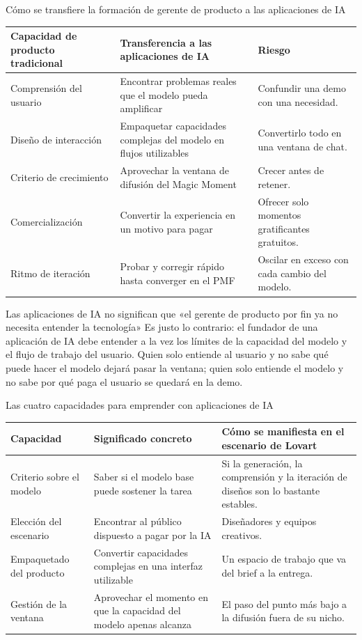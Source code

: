 \documentclass[a4paper]{article}
\begin{document}
\begin{knowledgebox}{Cómo se transfiere la formación de gerente de producto a las aplicaciones de IA}
\begin{tabularx}{\textwidth}{p{}p{}X}
\toprule
Capacidad de producto tradicional & Transferencia a las aplicaciones de IA & Riesgo \\
\midrule
Comprensión del usuario & Encontrar problemas reales que el modelo pueda amplificar & Confundir una demo con una necesidad. \\
Diseño de interacción & Empaquetar capacidades complejas del modelo en flujos utilizables & Convertirlo todo en una ventana de chat. \\
Criterio de crecimiento & Aprovechar la ventana de difusión del Magic Moment & Crecer antes de retener. \\
Comercialización & Convertir la experiencia en un motivo para pagar & Ofrecer solo momentos gratificantes gratuitos. \\
Ritmo de iteración & Probar y corregir rápido hasta converger en el PMF & Oscilar en exceso con cada cambio del modelo. \\
\bottomrule
\end{tabularx}
\end{knowledgebox}

\begin{warningbox}{Las aplicaciones de IA no significan que «el gerente de producto por fin ya no necesita entender la tecnología»}
Es justo lo contrario: el fundador de una aplicación de IA debe entender a la vez los límites de la capacidad del modelo y el flujo de trabajo del usuario. Quien solo entiende al usuario y no sabe qué puede hacer el modelo dejará pasar la ventana; quien solo entiende el modelo y no sabe por qué paga el usuario se quedará en la demo.
\end{warningbox}

\begin{knowledgebox}{Las cuatro capacidades para emprender con aplicaciones de IA}
\begin{tabularx}{\textwidth}{p{}p{}X}
\toprule
Capacidad & Significado concreto & Cómo se manifiesta en el escenario de Lovart \\
\midrule
Criterio sobre el modelo & Saber si el modelo base puede sostener la tarea & Si la generación, la comprensión y la iteración de diseños son lo bastante estables. \\
Elección del escenario & Encontrar al público dispuesto a pagar por la IA & Diseñadores y equipos creativos. \\
Empaquetado del producto & Convertir capacidades complejas en una interfaz utilizable & Un espacio de trabajo que va del brief a la entrega. \\
Gestión de la ventana & Aprovechar el momento en que la capacidad del modelo apenas alcanza & El paso del punto más bajo a la difusión fuera de su nicho. \\
\bottomrule
\end{tabularx}
\end{knowledgebox}
\end{document}
